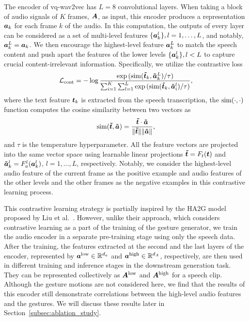 The encoder of vq-wav2vec has $L=8$ convolutional layers. When taking a block of audio signals of $K$ frames, $\bm{A}$, as input, this encoder produces a representation $\bm{a}_k$ for each frame $k$ of the audio. In this computation, the outputs of every layer can be considered as a set of multi-level features $\{\bm{a}_k^{l}\}, {l=1,\dots,L}$, and notably, $\bm{a}_k^{L}=\bm{a}_k$. We then encourage the highest-level feature $\bm{a}_k^{L}$ to match the speech content and push apart the features of the lower levels $\{\bm{a}_k^{l}\}, l<L$ to capture crucial content-irrelevant information. Specifically, we utilize the contrastive loss
\begin{equation}
    \mathcal{L}_{{\text{cont}}} = -\log{\frac{\exp{(\operatorname*{sim}(\bm{\tilde{t}}_{k}, \bm{\tilde{a}}^{L}_{k})/\tau)}}{\sum^{K}_{i=1}\sum_{l=1}^{L}\exp{(\operatorname*{sim}(\bm{\tilde{t}}_k, \bm{\tilde{a}}^{l}_{i})}/\tau)}},
\end{equation}
where the text feature $\bm{t}_k$ is extracted from the speech transcription, the $\operatorname*{sim}(\cdot,\cdot)$ function computes the cosine similarity between two vectors as
\begin{equation}
    \operatorname*{sim}(\bm{\tilde{t}},\bm{\tilde{a}})=\frac{\bm{\tilde{t}} \cdot \bm{\tilde{a}}}{\lVert \bm{\tilde{t}} \rVert\lVert \bm{\tilde{a}} \rVert},
\end{equation}
and $\tau$ is the temperature hyperparameter. All the feature vectors are projected into the same vector space using learnable linear projections $\bm{\tilde{t}}=F_t(\bm{t})$ and $\bm{\tilde{a}}_k^l=F_a^l(\bm{a}_k^l)$, $l=1,\dots,L$, respectively. Notably, we consider the highest-level audio feature of the current frame as the positive example and audio features of the other levels and the other frames as the negative examples in this contrastive learning process.

This contrastive learning strategy is partially inspired by the HA2G model proposed by Liu et al.~. However, unlike their approach, which considers contrastive learning as a part of the training of the gesture generator, we train the audio encoder in a separate pre-training stage using only the speech data. After the training, the features extracted at the second and the last layers of the encoder, represented by $\bm{a}^{{\text{low}}}\in\mathbb{R}^{d_a}$ and $\bm{a}^{{\text{high}}}\in\mathbb{R}^{d_A}$, respectively, are then used in different training and inference stages in the downstream generation task. They can be represented collectively as $\bm{A}^{{\text{low}}}$ and $\bm{A}^{{\text{high}}}$ for a speech clip. Although the gesture motions are not considered here, we find that the results of this encoder still demonstrate correlations between the high-level audio features and the gestures. We will discuss these results later in Section~\ref{subsec:ablation_study}.

